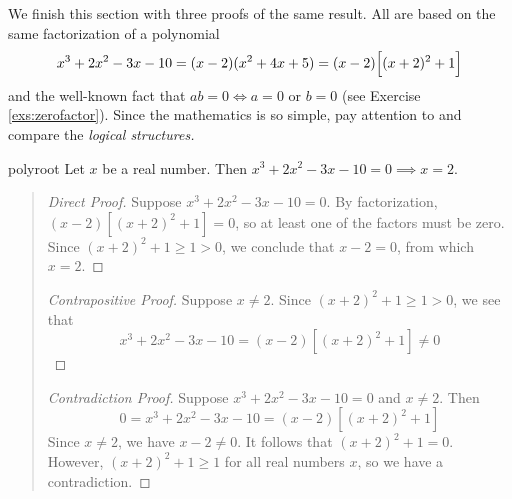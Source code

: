 
We finish this section with three proofs of the same result. All are based on the same factorization of a polynomial
\[
	x^3+2x^2-3x-10=(x-2)(x^2+4x+5)=(x-2)\Bigl[(x+2)^2+1\Bigr]
\]
and the well-known fact that $ab=0\iff a=0$ or $b=0$ (see Exercise \ref{exs:zerofactor}). Since the mathematics is so simple, pay attention to and compare the \emph{logical structures.}

\begin{example}{}{polyroot}
	Let $x$ be a real number. Then $x^3+2x^2-3x-10=0\implies x=2$.
	\begin{quote}
		\begin{proof}[Direct Proof]
			Suppose $x^3+2x^2-3x-10=0$. By factorization, $(x-2)[(x+2)^2+1]=0$, so at least one of the factors must be zero. Since $(x+2)^2+1\ge 1>0$, we conclude that $x-2=0$, from which $x=2$.
		\end{proof}
	
		\begin{proof}[Contrapositive Proof]
		Suppose $x\neq 2$. Since $(x+2)^2+1\ge 1>0$, we see that
			\[
				x^3+2x^2-3x-10=(x-2)[(x+2)^2+1]\neq 0 \tag*{\qedhere}
			\]
		\end{proof}
	
		\begin{proof}[Contradiction Proof]
			Suppose $x^3+2x^2-3x-10=0$ and $x\neq 2$. Then
			\[
				0=x^3+2x^2-3x-10=(x-2)[(x+2)^2+1]
			\]
			Since $x\neq 2$, we have $x-2\neq 0$. It follows that $(x+2)^2+1=0$. However, $(x+2)^2+1\ge 1$ for all real numbers $x$, so we have a contradiction.
		\end{proof}
	\end{quote}
\end{example}


